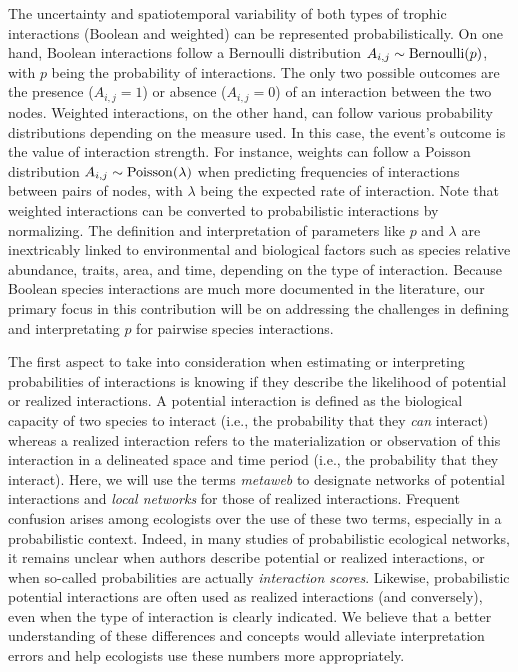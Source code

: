 \documentclass[11pt]{article}
\begin{document}
The uncertainty and spatiotemporal variability of both types of trophic
interactions (Boolean and weighted) can be represented
probabilistically. On one hand, Boolean interactions follow a Bernoulli
distribution \(A_{i,j} \sim {\rm Bernoulli}(p)\), with \(p\) being the
probability of interactions. The only two possible outcomes are the
presence (\(A_{i,j} = 1\)) or absence (\(A_{i,j} = 0\)) of an
interaction between the two nodes. Weighted interactions, on the other
hand, can follow various probability distributions depending on the
measure used. In this case, the event's outcome is the value of
interaction strength. For instance, weights can follow a Poisson
distribution \(A_{i,j} \sim {\rm Poisson}(\lambda)\) when predicting
frequencies of interactions between pairs of nodes, with \(\lambda\)
being the expected rate of interaction. Note that weighted interactions
can be converted to probabilistic interactions by normalizing. The
definition and interpretation of parameters like \(p\) and \(\lambda\)
are inextricably linked to environmental and biological factors such as
species relative abundance, traits, area, and time, depending on the
type of interaction. Because Boolean species interactions are much more
documented in the literature, our primary focus in this contribution
will be on addressing the challenges in defining and interpretating
\(p\) for pairwise species interactions.

The first aspect to take into consideration when estimating or
interpreting probabilities of interactions is knowing if they describe
the likelihood of potential or realized interactions. A potential
interaction is defined as the biological capacity of two species to
interact (i.e., the probability that they \emph{can} interact) whereas a
realized interaction refers to the materialization or observation of
this interaction in a delineated space and time period (i.e., the
probability that they interact). Here, we will use the terms
\emph{metaweb} to designate networks of potential interactions and
\emph{local networks} for those of realized interactions. Frequent
confusion arises among ecologists over the use of these two terms,
especially in a probabilistic context. Indeed, in many studies of
probabilistic ecological networks, it remains unclear when authors
describe potential or realized interactions, or when so-called
probabilities are actually \emph{interaction scores}. Likewise,
probabilistic potential interactions are often used as realized
interactions (and conversely), even when the type of interaction is
clearly indicated. We believe that a better understanding of these
differences and concepts would alleviate interpretation errors and help
ecologists use these numbers more appropriately.
\end{document}
